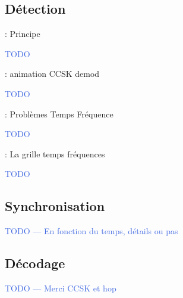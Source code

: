 \documentclass[../main.tex]{subfiles}
\begin{document}
\subsection{Détection}

\begin{frame}{\subsecname : {Principe}}
  \begin{center}
    \textcolor{RoyalBlue}{TODO}
  \end{center}
\end{frame}


\begin{frame}{\subsecname : {animation CCSK demod}}
  \begin{center}
    \textcolor{RoyalBlue}{TODO}
  \end{center}
\end{frame}

\begin{frame}{\subsecname : {Problèmes Temps Fréquence}}
  \begin{center}
    \textcolor{RoyalBlue}{TODO}
  \end{center}
\end{frame}


\begin{frame}{\subsecname : {La grille temps fréquences}}
  \begin{center}
    \textcolor{RoyalBlue}{TODO}
  \end{center}
\end{frame}

\subsection{Synchronisation}

\begin{frame}{\subsecname}
  \begin{center}
    \textcolor{RoyalBlue}{TODO --- En fonction du temps, détails ou pas}
  \end{center}
\end{frame}

\subsection{Décodage}

\begin{frame}{\subsecname}
  \begin{center}
    \textcolor{RoyalBlue}{TODO --- Merci CCSK et hop}
  \end{center}
\end{frame}
\end{document}
